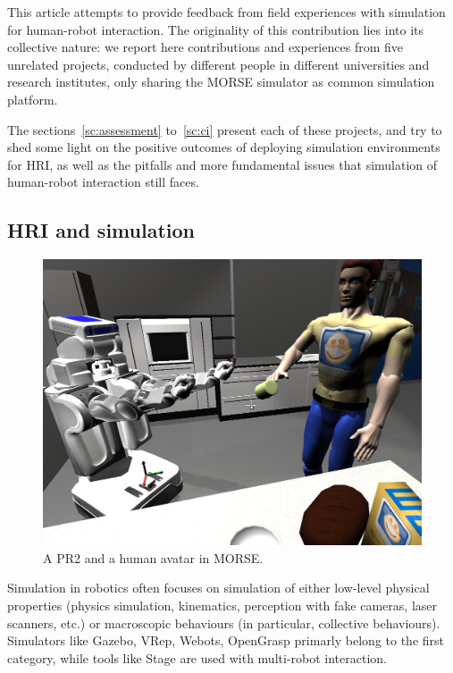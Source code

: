 \documentclass[conference]{IEEEtran}
\begin{document}



This article attempts to provide feedback from field experiences with simulation
for human-robot interaction. The originality of this contribution lies into its
collective nature: we report here contributions and experiences from five
unrelated projects, conducted by different people in different universities and
research institutes, only sharing the MORSE simulator as common simulation
platform.

The sections~\ref{sc:assessment} to~\ref{sc:ci} present each of these projects,
and try to shed some light on the positive outcomes of deploying simulation
environments for HRI, as well as the pitfalls and more fundamental issues that
simulation of human-robot interaction still faces.

\subsection*{HRI and simulation}

\begin{figure}[ht!]
      \centering
      \includegraphics[width=0.9\linewidth]{morse_pr2.jpg}
      \caption{A PR2 and a human avatar in MORSE.}
      \label{fig|morse-hri}
\end{figure}



Simulation in robotics often focuses on simulation of either low-level physical
properties (physics simulation, kinematics, perception with fake cameras, laser
scanners, etc.) or macroscopic behaviours (in particular, collective
behaviours). Simulators like Gazebo, VRep, Webots, OpenGrasp 
primarly belong to the first category, while tools like Stage  are used with multi-robot interaction.
\end{document}
